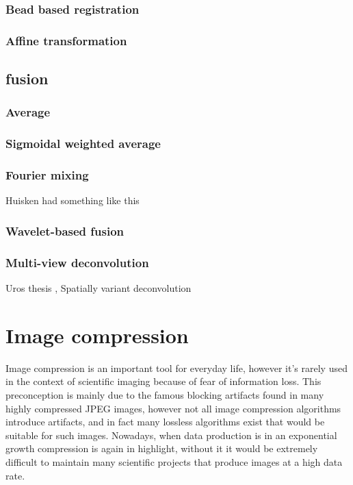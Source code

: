         \subsubsection{Bead based registration}
        \subsubsection{Affine transformation}
    \subsection{fusion}
        \subsubsection{Average}
        \subsubsection{Sigmoidal weighted average}
        \subsubsection{Fourier mixing}
        Huisken had something like this
        \subsubsection{Wavelet-based fusion}
        \subsubsection{Multi-view deconvolution}
        
        \cite{krzic_multiple-view_2009} Uros thesis
        \cite{temerinac-ott_multiview_2012}, \cite{temerinac-ott_spatially-variant_2011} Spatially variant deconvolution
        
        
\section{Image compression}
Image compression is an important tool for everyday life, however it's rarely used in the context of scientific imaging because of fear of information loss. This preconception is mainly due to the famous blocking artifacts found in many highly compressed JPEG images, however not all image compression algorithms introduce artifacts, and in fact many lossless algorithms exist that would be suitable for such images. Nowadays, when data production is in an exponential growth compression is again in highlight, without it it would be extremely difficult to maintain many scientific projects that produce images at a high data rate. 

